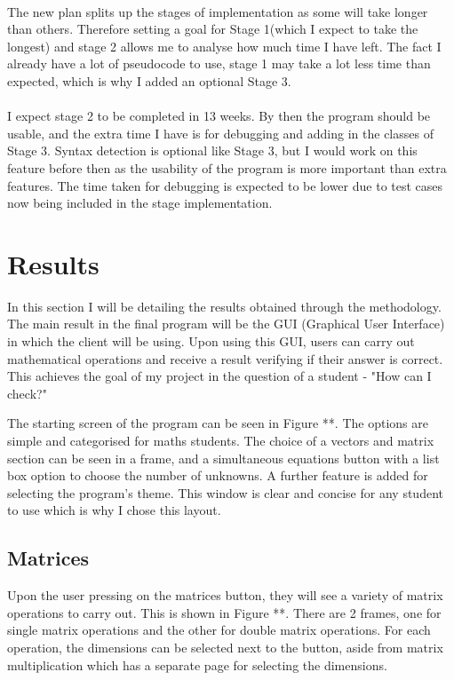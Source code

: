 \documentclass[final]{cmpreport}
\begin{document}
	\\The new plan splits up the stages of implementation as some will take longer than others. Therefore setting a goal for Stage 1(which I expect to take the longest) and stage 2 allows me to analyse how much time I have left. The fact I already have a lot of pseudocode to use, stage 1 may take a lot less time than expected, which is why I added an optional Stage 3. \\
	\\I expect stage 2 to be completed in 13 weeks. By then the program should be usable, and the extra time I have is for debugging and adding in the classes of Stage 3. Syntax detection is optional like Stage 3, but I would work on this feature before then as the usability of the program is more important than extra features. The time taken for debugging is expected to be lower due to test cases now being included in the stage implementation.
	
	\section{Results} \label{sec:results}
	
	In this section I will be detailing the results obtained through the methodology. The main result in the final program will be the GUI (Graphical User Interface) in which the client will be using. Upon using this GUI, users can carry out mathematical operations and receive a result verifying if their answer is correct. This achieves the goal of my project in the question of a student - "How can I check?"
	
	The starting screen of the program can be seen in Figure **. The options are simple and categorised for maths students. The choice of a vectors and matrix section can be seen in a frame, and a simultaneous equations button with a list box option to choose the number of unknowns. A further feature is added for selecting the program's theme. This window is clear and concise for any student to use which is why I chose this layout.
	
	\subsection{Matrices} \label{sec:matrices}
	
	Upon the user pressing on the matrices button, they will see a variety of matrix operations to carry out. This is shown in Figure **. There are 2 frames, one for single matrix operations and the other for double matrix operations. For each operation, the dimensions can be selected next to the button, aside from matrix multiplication which has a separate page for selecting the dimensions. 
	
\end{document}
